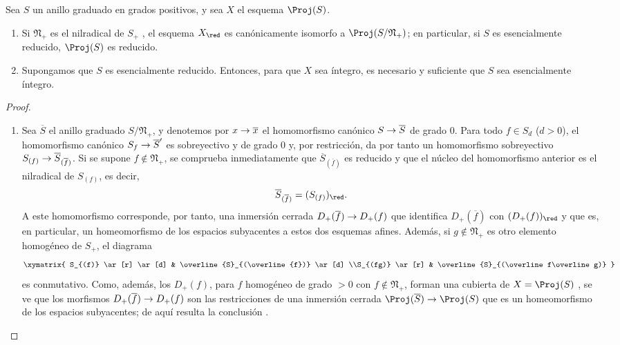 \documentclass[oneside,10pt]{amsart}
\makeatletter
\newcommand{\ega@arrow}[2]{\mathchoice{#1}{#2}{#2}{#2}}
\renewcommand{\to}{\ega@arrow{\longrightarrow}{\rightarrow}}
\let\EGAOriginalLabel\label
\renewcommand{\label}[1]{\phantomsection\EGAOriginalLabel{#1}}
\makeatother
\begin{document}
\begin{proposition}[2.4.4]
\label{II.2.4.4}
Sea $S$ un anillo graduado en grados positivos, y sea $X$ el esquema $\Proj(S)$.
\begin{enumerate}
  \item[\rm(i)] Si $\mathfrak{N}_+$ es el nilradical de $S_+$ , el esquema $X_\red$ es canónicamente isomorfo a $\Proj(S/\mathfrak{N}_+)$; en particular, si $S$ es esencialmente reducido, $\Proj(S)$ es reducido.
  \item[\rm(ii)] Supongamos que $S$ es esencialmente reducido. Entonces, para que $X$ sea íntegro, es necesario y suficiente que $S$ sea esencialmente íntegro.
\end{enumerate}
\end{proposition}

\begin{proof}
\medskip\noindent
\begin{enumerate}
  \item[\rm(i)] Sea $\overline{S}$ el anillo graduado $S/\mathfrak{N}_+$, y denotemos por $x\to\overline{x}$ el homomorfismo canónico $S\to\overline{S}$ de grado $0$.
  Para todo $f\in S_d$ ($d>0$), el homomorfismo canónico $S_f\to\overline{S}'$  es sobreyectivo y de grado $0$ y, por restricción, da por tanto un homomorfismo sobreyectivo $S_{(f)}\to\overline{S}_{(\overline{f})}$.
  Si se supone $f\notin\mathfrak{N}_+$, se comprueba inmediatamente que $\overline{S}_{(\overline{f})}$ es reducido y que el núcleo del homomorfismo anterior es el nilradical de $S_{(f)}$, es decir,
  \[
    \overline{S}_{(\overline{f})}=(S_{(f)})_\red.
  \]
  A este homomorfismo corresponde, por tanto, una inmersión cerrada $D_+(\overline{f})\to D_+(f)$ que identifica $D_+(\overline{f})$ con $(D_+(f))_\red$  y que es, en particular, un homeomorfismo de los espacios subyacentes a estos dos esquemas afines.
  Además, si $g\notin\mathfrak{N}_+$ es otro elemento homogéneo de $S_+$, el diagrama
  \[
    \xymatrix{
      S_{(f)} \ar[r] \ar[d]
      & \overline{S}_{(\overline{f})} \ar[d]
    \\S_{(fg)} \ar[r]
      & \overline{S}_{(\overline f\overline g)}
    }
  \]
  es conmutativo.
  Como, además, los $D_+(f)$, para $f$ homogéneo de grado $>0$ con $f\notin\mathfrak{N}_+$, forman una cubierta de $X=\Proj(S)$ , se ve que los morfismos $D_+(\overline{f})\to D_+(f)$ son las restricciones de una inmersión cerrada $\Proj(\overline{S})\to\Proj(S)$ que es un homeomorfismo de los espacios subyacentes; de aquí resulta la conclusión .

\end{enumerate}
\end{proof}
\end{document}
